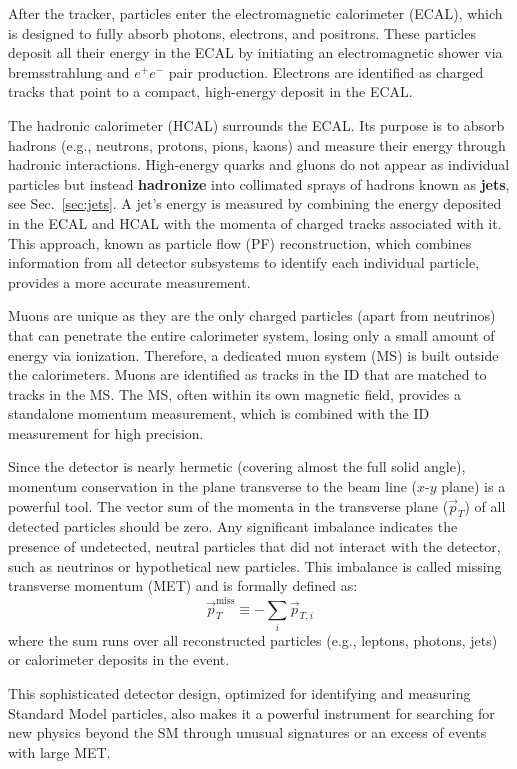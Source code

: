 After the tracker, particles enter the electromagnetic calorimeter (ECAL), which is designed to fully absorb photons, electrons, and positrons. These particles deposit all their energy in the ECAL by initiating an electromagnetic shower via bremsstrahlung and $e^{+}e^{-}$ pair production. Electrons are identified as charged tracks that point to a compact, high-energy deposit in the ECAL.

The hadronic calorimeter (HCAL) surrounds the ECAL. Its purpose is to absorb hadrons (e.g., neutrons, protons, pions, kaons) and measure their energy through hadronic interactions. High-energy quarks and gluons do not appear as individual particles but instead \textbf{hadronize} into collimated sprays of hadrons known as \textbf{jets}, see Sec.~\ref{sec:jets}. A jet's energy is measured by combining the energy deposited in the ECAL and HCAL with the momenta of charged tracks associated with it. This approach, known as particle flow (PF) reconstruction, which combines information from all detector subsystems to identify each individual particle, provides a more accurate measurement.


Muons are unique as they are the only charged particles (apart from neutrinos) that can penetrate the entire calorimeter system, losing only a small amount of energy via ionization. Therefore, a dedicated muon system (MS) is built outside the calorimeters. Muons are identified as tracks in the ID that are matched to tracks in the MS. The MS, often within its own magnetic field, provides a standalone momentum measurement, which is combined with the ID measurement for high precision.

Since the detector is nearly hermetic (covering almost the full solid angle), momentum conservation in the plane transverse to the beam line ($x$-$y$ plane) is a powerful tool. The vector sum of the momenta in the transverse plane ($\vec{p}_T$) of all detected particles should be zero. Any significant imbalance indicates the presence of undetected, neutral particles that did not interact with the detector, such as neutrinos or hypothetical new particles. This imbalance is called missing transverse momentum (MET) and is formally defined as:
$$
\vec{p}_T^{\text{miss}} \equiv -\sum_i \vec{p}_{T,i}
$$
where the sum runs over all reconstructed particles (e.g., leptons, photons, jets) or calorimeter deposits in the event.

This sophisticated detector design, optimized for identifying and measuring Standard Model particles, also makes it a powerful instrument for searching for new physics beyond the SM through unusual signatures or an excess of events with large MET.



